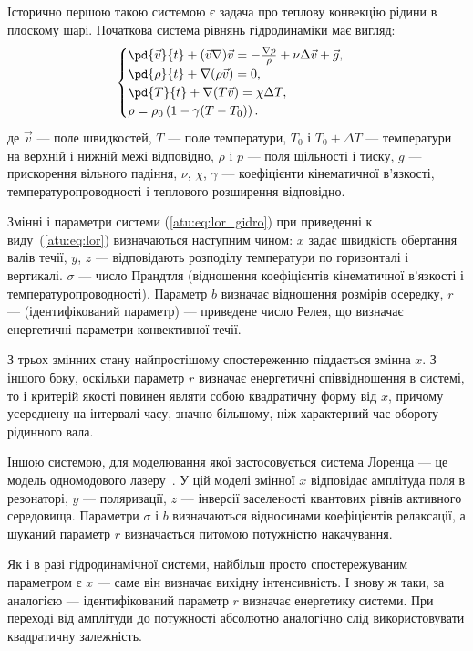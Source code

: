 Історично першою такою системою є задача про теплову
конвекцію рідини в плоскому шарі.
%
Початкова система рівнянь гідродинаміки має вигляд:
%
%
\begin{equation}
\begin{cases}
  \pd{\vec{v}}{t} + ( \vec{v} \nabla ) \vec{v} = - \frac{\nabla p}{\rho} + \nu \Delta \vec{v} + \vec{g}, \\
  \pd{\rho}{t} + \nabla ( \rho \vec{v} ) = 0 , \\
  \pd{T}{t} +\nabla ( T \vec{v} ) = \chi \Delta T , \\
  \rho = \rho_0 \left( 1 - \gamma (T - T_0) \right) .
\end{cases}
\label{atu:eq:lor_gidro}
\end{equation}
%
де
$ \Vec{v} $ --- поле швидкостей,
$ T $ --- поле температури,
$ T_0 $ і $ T_0 + \Delta T $ --- температури на верхній і нижній межі відповідно,
$ \rho $ і $ p $ --- поля щільності і тиску,
$ g $ --- прискорення вільного падіння,
$ \nu $,
$ \chi $,
$ \gamma $ --- коефіцієнти кінематичної в'язкості,
температуропроводності і теплового розширення відповідно.

Змінні і параметри системи (\ref{atu:eq:lor_gidro}) при приведенні к виду~(\ref{atu:eq:lor})
визначаються наступним чином:
$x$ задає швидкість обертання валів течії,
$y$, $z$ --- відповідають розподілу температури по горизонталі і вертикалі.
$\sigma$ --- число Прандтля (відношення коефіцієнтів кінематичної в'язкості і температуропроводності).
Параметр $b$ визначає відношення розмірів осередку,
$r$ --- (ідентифікований параметр) --- приведене число Релея, що визначає енергетичні параметри
конвективної течії.

З трьох змінних стану найпростішому спостереженню піддається змінна $x$.
З іншого боку, оскільки параметр $r$ визначає енергетичні співвідношення в
системі, то і критерій якості повинен являти собою квадратичну форму від $x$,
причому усереднену на інтервалі часу, значно більшому, ніж характерний час
обороту рідинного вала.

Іншою системою, для моделювання якої застосовується система
Лоренца --- це модель одномодового лазеру~\cite{andrianov_laser}. У цій
моделі змінної
$ x $ відповідає амплітуда поля в резонаторі,
$ y $ --- поляризації,
$ z $ --- інверсії заселеності квантових рівнів активного середовища. Параметри
$ \sigma $ і $ b $ визначаються відносинами коефіцієнтів релаксації, а шуканий
параметр
$r$ визначається питомою потужністю накачування.

Як і в разі гідродинамічної системи, найбільш просто
спостережуваним параметром є
$x$ --- саме він визначає вихідну інтенсивність. І знову ж таки,
за аналогією --- ідентифікований параметр
$r$ визначає енергетику системи. При переході від амплітуди
до потужності абсолютно аналогічно слід використовувати
квадратичну залежність.

